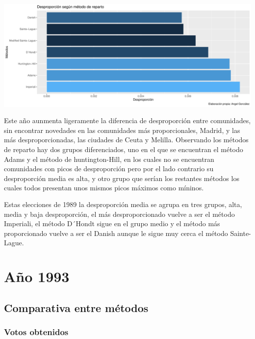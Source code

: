 \documentclass[12pt,a4paper,]{book}
\numberwithin{dummy}{section}
\theoremstyle{ocrenumbox}
\theoremstyle{blacknumex}
\theoremstyle{blacknumbox}
\theoremstyle{ocrenum}
\theoremstyle{ocrenum}
\begin{document}
\begin{center}\includegraphics[width=0.95\linewidth]{figurasR/unnamed-chunk-48-2} \end{center}

Este año aunmenta ligeramente la diferencia de desproporción entre
comunidades, sin encontrar novedades en las comunidades más
proporcionales, Madrid, y las más desproporcionadas, las ciudades de
Ceuta y Melilla. Observando los métodos de reparto hay dos grupos
diferenciados, uno en el que se encuentran el método Adams y el método
de huntington-Hill, en los cuales no se encuentran comunidades con picos
de desproporción pero por el lado contrario su desproporción media es
alta, y otro grupo que serían los restantes métodos los cuales todos
presentan unos mismos picos máximos como míninos.

Estas elecciones de 1989 la desproporción media se agrupa en tres
grupos, alta, media y baja desproporción, el más desproporcionado vuelve
a ser el método Imperiali, el método D´Hondt sigue en el grupo medio y
el método más proporcionado vuelve a ser el Danish aunque le sigue muy
cerca el método Sainte-Lague.

\hypertarget{auxf1o-1993}{%
\section{Año 1993}\label{auxf1o-1993}}

\hypertarget{comparativa-entre-muxe9todos-5}{%
\subsection{Comparativa entre
métodos}\label{comparativa-entre-muxe9todos-5}}

\hypertarget{votos-obtenidos-5}{%
\subsubsection{Votos obtenidos}\label{votos-obtenidos-5}}
\end{document}
